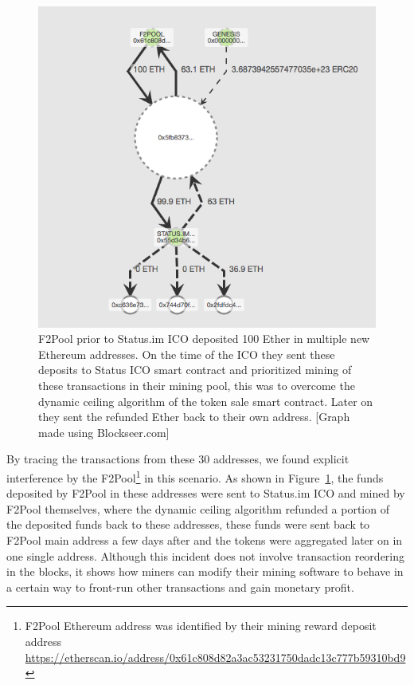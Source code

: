 
\begin{figure}[t]
\centering
\includegraphics[width=0.6\linewidth]{figures/F2Pool_transactions_to_StatusICO_and_Refunds.png}
\caption{ F2Pool prior to Status.im ICO deposited 100 Ether in multiple new Ethereum addresses. On the time of the ICO they sent these deposits to Status ICO smart contract and prioritized mining of these transactions in their mining pool, this was to overcome the dynamic ceiling algorithm of the token sale smart contract. Later on they sent the refunded Ether back to their own address. [Graph made using Blockseer.com] \label{fig:f2poolfront-run}}
\end{figure}

By tracing the transactions from these 30 addresses, we found explicit interference by the F2Pool\footnote{F2Pool Ethereum address was identified by their mining reward deposit address \url{https://etherscan.io/address/0x61c808d82a3ac53231750dadc13c777b59310bd9}} in this scenario. As shown in Figure~\ref{fig:f2poolfront-run}, the funds deposited by F2Pool in these addresses were sent to Status.im ICO and mined by F2Pool themselves, where the dynamic ceiling algorithm refunded a portion of the deposited funds back to these addresses, these funds were sent back to F2Pool main address a few days after and the tokens were aggregated later on in one single address. Although this incident does not involve transaction reordering in the blocks, it shows how miners can modify their mining software to behave in a certain way to front-run other transactions and gain monetary profit.




